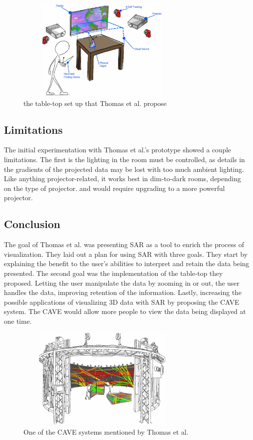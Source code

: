 \documentclass{sig-alternate}
\begin{document}
\begin{figure}
	\includegraphics[width=8.5cm, height=5cm]{Tabletop}
	\caption{the table-top set up that Thomas et al. propose \cite{3D}}
	\label{fig:Tabletop}
\end{figure}

\subsection{Limitations}
\label{sec:Limitations}
The initial experimentation with Thomas et al.'s \cite{3D} prototype showed a couple limitations. The first is the lighting in the room must be controlled, as details in the gradients of the projected data may be lost with too much ambient lighting. Like anything projector-related, it works best in dim-to-dark rooms, depending on the type of projector. and would require upgrading to a more powerful projector.

\subsection{Conclusion}
\label{sec:Conclusion}
The goal of Thomas et al. \cite{3D} was presenting SAR as a tool to enrich the process of visualization. They laid out a plan for using SAR with three goals. They start by explaining the benefit to the user's abilities to interpret and retain the data being presented. The second goal was the implementation of the table-top they proposed. Letting the user manipulate the data by zooming in or out, the user handles the data, improving retention of the information. Lastly, increasing the possible applications of visualizing 3D data with SAR by proposing the CAVE system. The CAVE would allow more people to view the data being displayed at one time.

\begin{figure}
	\includegraphics[width=8.5cm, height=5cm]{Cave}
	\caption{One of the CAVE systems mentioned by Thomas et al. \cite{3D}}
	\label{fig:Cave}
\end{figure}  
\end{document}
